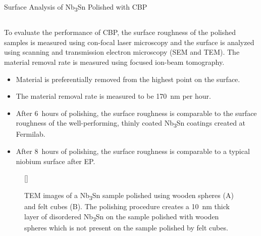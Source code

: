 \documentclass{beamer}
\begin{document}
\begin{frame}{}
\begin{columns}[t]
\begin{column}{0.32\linewidth}
\begin{block}{\label{sec:samplestudy}Surface Analysis of Nb\textsubscript{3}Sn Polished with CBP}
\begin{columns}[t]
                    \end{columns}
                    To evaluate the performance of CBP, the surface roughness of the polished samples is measured using con-focal laser microscopy and the surface is analyzed using scanning and transmission electron microscopy (SEM and TEM). The material removal rate is measured using focused ion-beam tomography.
                    \begin{itemize}                        
                        \item Material is preferentially removed from the highest point on the surface.
                        \item The material removal rate is measured to be 170~nm per hour.
                        \item After 6~hours of polishing, the surface roughness is comparable to the surface roughness of the well-performing, thinly coated Nb\textsubscript{3}Sn coatings created at Fermilab\cite{posen2021advances}.
                        \item After 8~hours of polishing, the surface roughness is comparable to a typical niobium surface after EP.
                    \end{itemize}
                    \begin{figure}
                        [\FBwidth]
                        {\caption{TEM images of a Nb\textsubscript{3}Sn sample polished using wooden spheres (A) and felt cubes (B). The polishing procedure creates a 10~nm thick layer of disordered Nb\textsubscript{3}Sn on the sample polished with wooden spheres which is not present on the sample polished by felt cubes.}\label{fig:samplesurfacedamagelayer}}

\end{figure}
\end{block}
\end{column}
\end{columns}
\end{frame}
\end{document}
